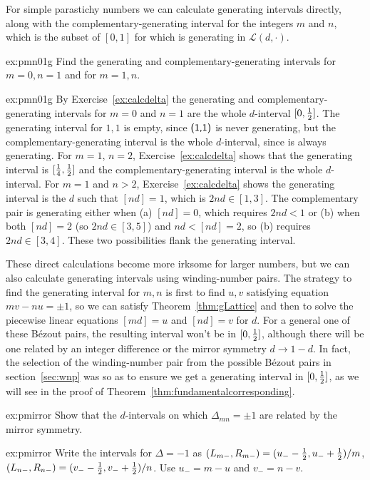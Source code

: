 For simple parastichy numbers we can calculate generating intervals directly, along with the 
complementary-generating interval for the integers $m$ and $n$, which is the subset of  $[0,1]$ for which   is generating in  $\mathcal{L}(d,\cdot)$.
\begin{jExercise}{ex:pmn01g}
	Find the generating and complementary-generating intervals for $m=0,n=1$ and for $m=1,n$. 
\end{jExercise}
\begin{jAnswer}{ex:pmn01g}
	 By Exercise~\ref{ex:calcdelta} the generating and complementary-generating intervals for $m=0$ and $n=1$ are the whole $d$-interval  $[0,\textstyle{\frac{1}{2}}]$.  
	The generating interval for $1,1$ is empty, since $\textsf{(1,1)}$ is never generating, but the complementary-generating interval is the whole $d$-interval, since  is always generating.
For $m=1$, $n=2$, Exercise~\ref{ex:calcdelta} shows that the generating interval is $[\textstyle{\frac{1}{4}},\textstyle{\frac{1}{2}}]$ and the complementary-generating interval is the whole $d$-interval.
For $m=1$ and $n>2$,  Exercise~\ref{ex:calcdelta} shows the generating interval is the $d$ such that $[nd]=1$, which is $2nd\in [1,3]$.  
The complementary pair is generating either when (a) $[nd]=0$, which requires $2nd<1$ or (b) when both $[nd]=2$ (so $2nd\in [3,5]$) and $nd<[nd]=2$,
so (b) requires $2nd\in[3,4]$. These two possibilities flank the generating interval.
\end{jAnswer}
These direct calculations become more irksome for larger numbers, but we can also calculate generating intervals using winding-number pairs. The strategy to find the generating interval for ${m,n}$ is first to find $u,v$ satisfying equation $mv-nu=\pm 1$, so we can satisfy Theorem~\ref{thm:gLattice} and then to solve the piecewise linear equations $[md]=u$ and $[nd]=v$ for $d$. For a general one of these B\'ezout pairs, the resulting interval won't be in $[0,\textstyle{\frac{1}{2}}]$, although there will be one related by an integer difference or the mirror symmetry $d\rightarrow1-d$. In fact, the selection of the winding-number pair from the possible B\'ezout pairs in section~\ref{sec:wnp} was so as to ensure we get a generating interval in $[0,\textstyle{\frac{1}{2}}]$, as we will see in the proof of Theorem~\ref{thm:fundamentalcorresponding}. 


\begin{jExercise}{ex:pmirror}
	Show that the $d$-intervals on which
	$\Delta_{mn}=\pm1$ are related by the mirror symmetry.
\end{jExercise}
\begin{jAnswer}{ex:pmirror}
	Write the intervals for $\Delta=-1$ as $(L_{m-},R_{m-})= (u_--\textstyle{\frac{1}{2}},u_-+\textstyle{\frac{1}{2}})/m$, $(L_{n-},R_{n-})= (v_--\textstyle{\frac{1}{2}},v_-+\textstyle{\frac{1}{2}})/n$.
	Use $u_-=m-u$ and $v_-=n-v$. 
\end{jAnswer}

